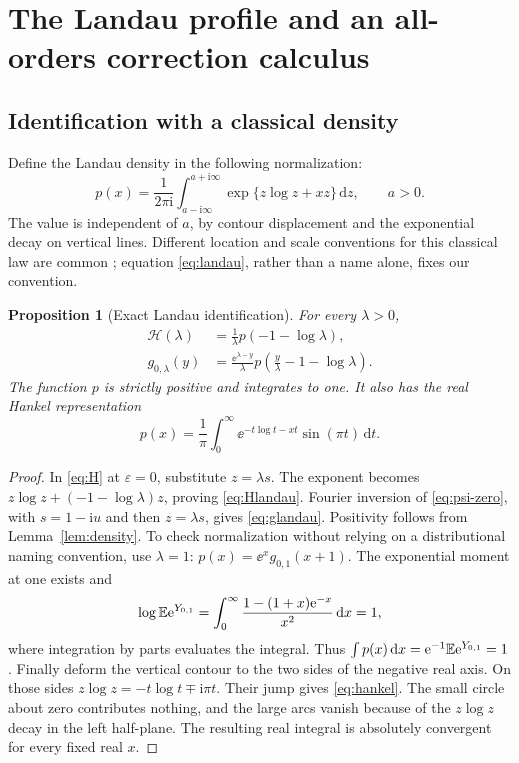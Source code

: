 \documentclass[11pt,a4paper]{article}
\numberwithin{equation}{section}
\newtheorem{proposition}[theorem]{Proposition}
\theoremstyle{definition}
\theoremstyle{remark}
\newcommand{\dd}{\,\mathrm d}\newcommand{\ii}{\mathrm i}
\newcommand{\ep}{\varepsilon}\newcommand{\la}{\lambda}
\newcommand{\HH}{\mathcal H}\newcommand{\RR}{\mathcal R}
\begin{document}
\section{The Landau profile and an all-orders correction calculus}
\label{sec:landau}

\subsection{Identification with a classical density}
Define the Landau density in the following normalization:
\begin{equation}\label{eq:landau}
 p(x)=\frac1{2\pi\ii}\int_{a-\ii\infty}^{a+\ii\infty}
                \exp\{z\log z+xz\}\dd z,\qquad a>0.
\end{equation}
The value is independent of \(a\), by contour displacement and the
exponential decay on vertical lines. Different location and scale
conventions for this classical law are common \cite{bulyak}; equation
\eqref{eq:landau}, rather than a name alone, fixes our convention.

\begin{proposition}[Exact Landau identification]\label{prop:landau}
For every \(\la>0\),
\begin{align}
 \HH(\la)&=\frac1\la p(-1-\log\la),\label{eq:Hlandau}\\
 g_{0,\la}(y)&=\frac{\ee^{\la-y}}\la
      p\left(\frac y\la-1-\log\la\right).
 \label{eq:glandau}
\end{align}
The function \(p\) is strictly positive and integrates to one.
It also has the real Hankel representation
\begin{equation}\label{eq:hankel}
 p(x)=\frac1\pi\int_0^\infty
             \ee^{-t\log t-xt}\sin(\pi t)\dd t.
\end{equation}
\end{proposition}
\begin{proof}
In \eqref{eq:H} at \(\ep=0\), substitute \(z=\la s\).
The exponent becomes
\(z\log z+(-1-\log\la)z\), proving \eqref{eq:Hlandau}.
Fourier inversion of \eqref{eq:psi-zero}, with
\(s=1-\ii u\) and then \(z=\la s\), gives \eqref{eq:glandau}.
Positivity follows from Lemma~\ref{lem:density}. To check normalization
without relying on a distributional naming convention, use \(\la=1\):
\(p(x)=\ee^x g_{0,1}(x+1)\). The exponential moment at one exists and
\[
 \log\E\ee^{Y_{0,1}}
 =\int_0^\infty\frac{1-(1+x)\ee^{-x}}{x^2}\dd x=1,
\]
where integration by parts evaluates the integral. Thus
\(\int p(x)\dd x=\ee^{-1}\E\ee^{Y_{0,1}}=1\).
Finally deform the vertical contour to the two sides of the negative
real axis. On those sides
\(z\log z=-t\log t\mp\ii\pi t\). Their jump gives
\eqref{eq:hankel}. The small circle about zero contributes nothing,
and the large arcs vanish because of the \(z\log z\) decay in the left
half-plane. The resulting real integral is absolutely convergent for
every fixed real \(x\).
\end{proof}
\end{document}
